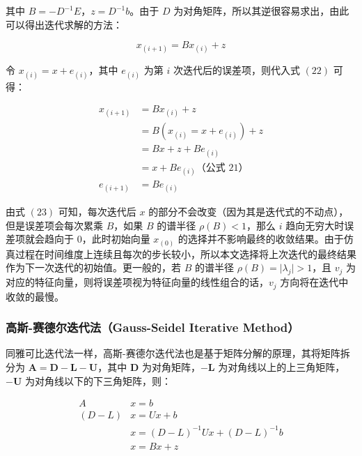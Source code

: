 \documentclass[UTF8]{ctexart}
\begin{document}
其中 $B = -D^{-1} E$，$z = D^{-1}b$。由于 $D$ 为对角矩阵，所以其逆很容易求出，由此可以得出迭代求解的方法：

\begin{large}
\begin{equation}
x_{(i+1)} = Bx_{(i)} + z
\end{equation}
\end{large}

令 $x_{(i)} = x + e_{(i)}$，其中 $e_{(i)}$ 为第 $i$ 次迭代后的误差项，则代入式 $(22)$ 可得：

\begin{large}
\begin{equation}
\begin{split}
x_{(i+1)} &= Bx_{(i)} + z \\
&= B(x_{(i)} = x + e_{(i)}) + z \\
&= Bx + z + Be_{(i)} \\
&= x + Be_{(i)} \text{（公式 21）} \\
e_{(i+1)} &= Be_{(i)}
\end{split}
\end{equation}
\end{large}

由式 $(23)$ 可知，每次迭代后 $x$ 的部分不会改变（因为其是迭代式的不动点），但是误差项会每次累乘 $B$，如果 $B$ 的谱半径 $\rho (B) < 1$，那么 $i$ 趋向无穷大时误差项就会趋向于 $0$，此时初始向量 $x_{(0)}$ 的选择并不影响最终的收敛结果。由于仿真过程在时间维度上连续且每次的步长较小，所以本文选择将上次迭代的最终结果作为下一次迭代的初始值。更一般的，若 $B$ 的谱半径 $\rho (B) = \lvert \lambda_{j} \rvert > 1$，且 $v_j$ 为对应的特征向量，则将误差项视为特征向量的线性组合的话，$v_j$ 方向将在迭代中收敛的最慢。

\subsubsection {高斯-赛德尔迭代法（Gauss-Seidel Iterative Method）}

同雅可比迭代法一样，高斯-赛德尔迭代法也是基于矩阵分解的原理，其将矩阵拆分为 $\mathbf{A = D - L - U}$，其中 $\mathbf{D}$ 为对角矩阵，$\mathbf{-L}$ 为对角线以上的上三角矩阵，$\mathbf{-U}$ 为对角线以下的下三角矩阵，则：

\begin{large}
\begin{equation}
\begin{split}
A&x = b \\
(D - L)&x = Ux + b \\
&x =  (D - L)^{-1} Ux + (D - L)^{-1} b \\ 
&x = Bx + z
\end{split}
\end{equation}
\end{large}
\end{document}
